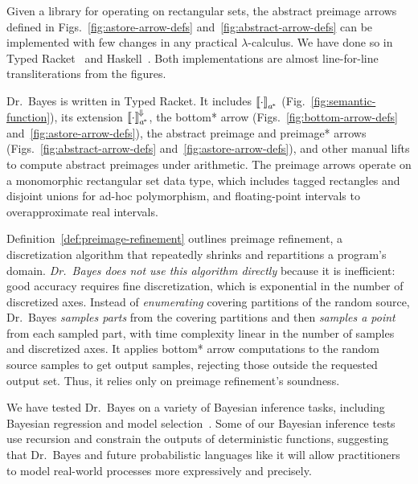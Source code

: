 \documentclass{llncs}
\newcommand{\figref}[1]{Fig.~\ref{#1}}
\newcommand{\figsref}[1]{Figs.~\ref{#1}}
\newcommand{\conv}{^{\mspace{-2mu}\Downarrow\mspace{-2mu}}}
\newcommand{\genc}{_{a^{\mspace{-2mu}*}}}
\begin{document}
Given a library for operating on rectangular sets, the abstract preimage arrows defined in \figsref{fig:astore-arrow-defs} and~\ref{fig:abstract-arrow-defs} can be implemented with few changes in any practical $\lambda$-calculus.
We have done so in Typed Racket~\cite{cit:tobin-hochstadt-2008popl-typed-scheme} and Haskell~\cite{cit:haskell-lang}.
Both implementations are almost line-for-line transliterations from the figures.

Dr.~Bayes is written in Typed Racket.
It includes $\meaningof{\cdot}\genc$ (\figref{fig:semantic-function}), its extension $\meaningof{\cdot}\genc\conv$, the bottom* arrow (\figsref{fig:bottom-arrow-defs} and~\ref{fig:astore-arrow-defs}), the abstract preimage and preimage* arrows (\figsref{fig:abstract-arrow-defs} and~\ref{fig:astore-arrow-defs}), and other manual lifts to compute abstract preimages under arithmetic.
The preimage arrows operate on a monomorphic rectangular set data type, which includes tagged rectangles and disjoint unions for ad-hoc polymorphism, and floating-point intervals to overapproximate real intervals.

Definition~\ref{def:preimage-refinement} outlines preimage refinement, a discretization algorithm that repeatedly shrinks and repartitions a program's domain.
\emph{Dr.~Bayes does not use this algorithm directly} because it is inefficient: good accuracy requires fine discretization, which is exponential in the number of discretized axes.
Instead of \emph{enumerating} covering partitions of the random source, Dr.~Bayes \emph{samples parts} from the covering partitions and then \emph{samples a point} from each sampled part, with time complexity linear in the number of samples and discretized axes.
It applies bottom* arrow computations to the random source samples to get output samples, rejecting those outside the requested output set.
Thus, it relies only on preimage refinement's soundness.

We have tested Dr.~Bayes on a variety of Bayesian inference tasks, including Bayesian regression and model selection~\cite{cit:toronto-thesis}.
Some of our Bayesian inference tests use recursion and constrain the outputs of deterministic functions, suggesting that Dr.~Bayes and future probabilistic languages like it will allow practitioners to model real-world processes more expressively and precisely.
\end{document}
